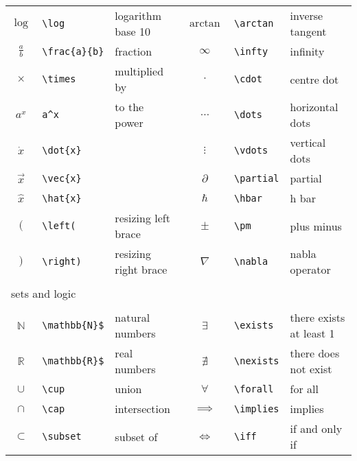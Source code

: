 \begin{table}[ht!]
\begin{tabular}{cll|cll}
        $\log$	        &	\verb|\log|	        &	logarithm base 10	&	$\arctan$	        &	\verb|\arctan|	        &	inverse tangent	    \\
        $\frac{a}{b}$	&	\verb|\frac{a}{b}|	&	fraction    	    &	$\infty$	        &	\verb|\infty|	        &	infinity	        \\
        $\times$	    &	\verb|\times|	    &	multiplied by	    &	$\cdot$	            &	\verb|\cdot|	        &	centre dot	        \\
        $a^x$	        &	\verb|a^x|	        &	to the power	    &	$\dots$	            &	\verb|\dots|	        &	horizontal dots	    \\
        $\dot{x}$   	&	\verb|\dot{x}|	    &		                &	$\vdots$	        &	\verb|\vdots|	        &	vertical dots	    \\
        $\vec{x}$	    &	\verb|\vec{x}|	    &		                &	$\partial$	        &	\verb|\partial|	        &	partial	            \\
        $\hat{x}$	    &	\verb|\hat{x}|	    &		                &	$\hbar$	            &	\verb|\hbar|	        &	h bar	            \\
        $\left(\right.$	&	\verb|\left(|	    &	resizing left brace	&	$\pm$	            &	\verb|\pm|	            &   plus minus          \\
        $\left.\right)$	&	\verb|\right)|	    &	resizing right brace&	$\nabla$	        &	\verb|\nabla|	        &	nabla operator		\\
        \\\multicolumn{2}{l}{sets and logic}	&		                &		                &		                    &		                \\\\
        $\mathbb{N}$	&	\verb|\mathbb{N}$|	&	natural numbers	    &	$\exists$	        &	\verb|\exists|	        &	there exists at least 1	\\
        $\mathbb{R}$	&	\verb|\mathbb{R}$|	&	real numbers	    &	$\nexists$	        &	\verb|\nexists|	        &	there does not exist	\\
        $\cup$	        &	\verb|\cup|	        &	union	            &	$\forall$	        &	\verb|\forall|	        &	for all	            \\
        $\cap$	        &	\verb|\cap|	        &	intersection	    &	$\implies$	        &	\verb|\implies|	        &	implies	            \\
        $\subset$	    &	\verb|\subset|	    &	subset of	        &	$\iff$	            &	\verb|\iff|	            &	if and only if	    \\

\end{tabular}
\end{table}
